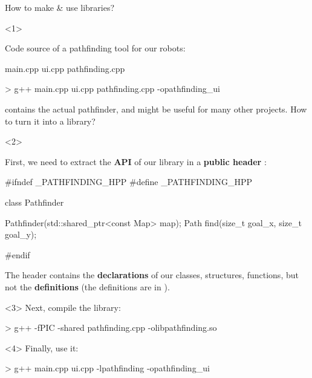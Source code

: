 \documentclass[compress]{beamer}
\begin{document}
\begin{frame}[fragile]{How to make \& use libraries?}

\begin{onlyenv}<1>

Code source of a pathfinding tool for our robots:

\begin{shcode}
main.cpp
ui.cpp
pathfinding.cpp
\end{shcode}

\begin{shcode}
> g++ main.cpp ui.cpp pathfinding.cpp -opathfinding_ui
\end{shcode}


 contains the actual pathfinder, and might be useful for
many other projects. How to turn it into a library?

\end{onlyenv}
\begin{onlyenv}<2>

First, we need to extract the \textbf{API} of our library in a
\textbf{public header} :

\begin{cppcode}
#ifndef _PATHFINDING_HPP
#define _PATHFINDING_HPP

class Pathfinder {

    Pathfinder(std::shared_ptr<const Map> map);
    Path find(size_t goal_x, size_t goal_y);
}

#endif
\end{cppcode}

The header contains the \textbf{declarations} of our classes, structures,
functions, but not the \textbf{definitions} (the definitions are in
).

\end{onlyenv}

\begin{onlyenv}<3>
Next, compile the library:

\begin{shcode}
> g++ -fPIC -shared pathfinding.cpp -olibpathfinding.so
\end{shcode}
\end{onlyenv}

\begin{onlyenv}<4>
Finally, use it:

\begin{shcode}
> g++ main.cpp ui.cpp -lpathfinding -opathfinding_ui
\end{shcode}
\end{onlyenv}


\end{frame}
\end{document}
